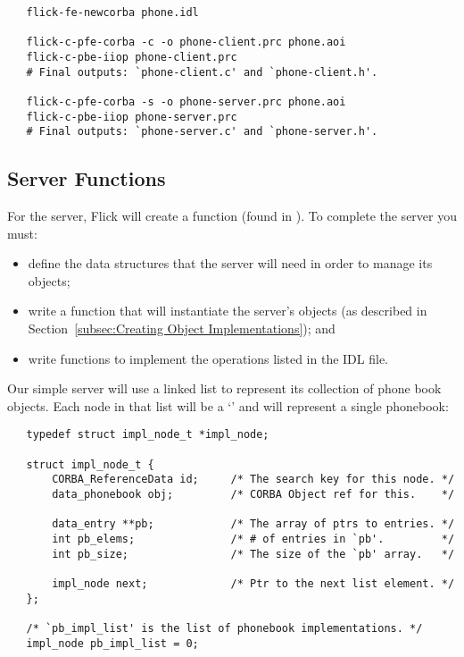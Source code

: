 \begin{verbatim}
   flick-fe-newcorba phone.idl

   flick-c-pfe-corba -c -o phone-client.prc phone.aoi
   flick-c-pbe-iiop phone-client.prc
   # Final outputs: `phone-client.c' and `phone-client.h'.

   flick-c-pfe-corba -s -o phone-server.prc phone.aoi
   flick-c-pbe-iiop phone-server.prc
   # Final outputs: `phone-server.c' and `phone-server.h'.
\end{verbatim}



\subsection{Server Functions}
\label{subsec:CORBA:Server Functions}

For the server, Flick will create a  function (found in
).  To complete the server you must:

\begin{itemize}
  \item define the data structures that the server will need in order to manage
  its objects;

  \item write a  function that will instantiate the
  server's objects (as described in Section~\ref{subsec:Creating Object
  Implementations}); and

  \item write functions to implement the operations listed in the IDL file.
\end{itemize}

Our simple server will use a linked list to represent its collection of phone
book objects.  Each node in that list will be a `'
and will represent a single phonebook:

\begin{verbatim}
   typedef struct impl_node_t *impl_node;

   struct impl_node_t {
       CORBA_ReferenceData id;     /* The search key for this node. */
       data_phonebook obj;         /* CORBA Object ref for this.    */

       data_entry **pb;            /* The array of ptrs to entries. */
       int pb_elems;               /* # of entries in `pb'.         */
       int pb_size;                /* The size of the `pb' array.   */

       impl_node next;             /* Ptr to the next list element. */
   };

   /* `pb_impl_list' is the list of phonebook implementations. */
   impl_node pb_impl_list = 0;
\end{verbatim}

